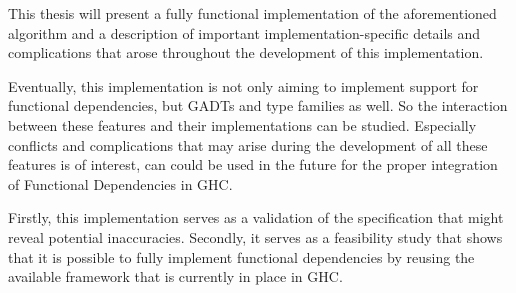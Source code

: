 This thesis will present a fully functional implementation of the aforementioned
algorithm and a description of important implementation-specific details and
complications that arose throughout the development of this implementation.

Eventually, this implementation is not only aiming to implement support for functional dependencies,
but GADTs and type families as well. So the interaction between these features
and their implementations can be studied. Especially conflicts and complications
that may arise during the development of all these features is of interest, can
could be used in the future for the proper integration of Functional
Dependencies in GHC.

Firstly, this implementation serves as a validation of the specification
that might reveal potential inaccuracies. Secondly, it serves as a feasibility study
that shows that it is possible to fully implement functional dependencies by
reusing the available framework that is currently in place in GHC.
